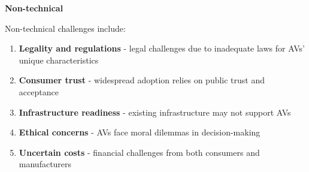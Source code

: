 \documentclass[10pt,oneside,english,a4paper]{article}
\begin{document}
\indent \textbf{Non-technical}
\par Non-technical challenges include:
\begin{enumerate}
    \item \textbf{Legality and regulations} - legal challenges due to inadequate laws for AVs' unique characteristics 
    \item \textbf{Consumer trust} - widespread adoption relies on public trust and acceptance
    \item \textbf{Infrastructure readiness} - existing infrastructure may not support AVs
    \item \textbf{Ethical concerns} - AVs face moral dilemmas in decision-making
    \item \textbf{Uncertain costs} - financial challenges from both consumers and manufacturers
\end{enumerate}
\end{document}
